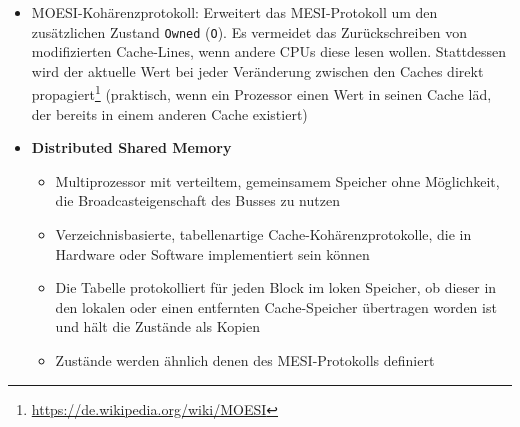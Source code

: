 \begin{itemize}
			\item MOESI-Kohärenzprotokoll: Erweitert das MESI-Protokoll um den zusätzlichen Zustand \texttt{Owned} (\texttt{O}). Es vermeidet das Zurückschreiben von modifizierten Cache-Lines, wenn andere CPUs diese lesen wollen. Stattdessen wird der aktuelle Wert bei jeder Veränderung zwischen den Caches direkt propagiert\footnote{\url{https://de.wikipedia.org/wiki/MOESI}} (praktisch, wenn ein Prozessor einen Wert in seinen Cache läd, der bereits in einem anderen Cache existiert)
			\item \textbf{Distributed Shared Memory}
			\begin{itemize}
				\item Multiprozessor mit verteiltem, gemeinsamem Speicher ohne Möglichkeit, die Broadcasteigenschaft des Busses zu nutzen
				\item Verzeichnisbasierte, tabellenartige Cache-Kohärenzprotokolle, die in Hardware oder Software implementiert sein können
				\item Die Tabelle protokolliert für jeden Block im loken Speicher, ob dieser in den lokalen oder einen entfernten Cache-Speicher übertragen worden ist und hält die Zustände als Kopien
				\item Zustände werden ähnlich denen des MESI-Protokolls definiert
			\end{itemize}
		\end{itemize}

